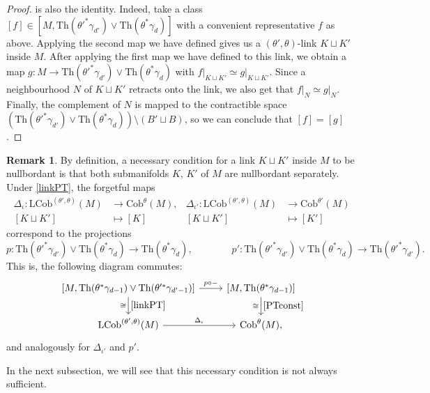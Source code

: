 \documentclass[a4paper, 11pt,reqno]{amsart}
\theoremstyle{plain}
\theoremstyle{definition}
\newtheorem{remark}[theorem]{Remark}
\newcommand{\Th}{\mathrm{Th}}
\begin{document}
\begin{proof}
is also the identity. Indeed, take a class $[f]\in\left[M, \Th(\theta'^\ast\gamma_{d'})\vee\Th(\theta^\ast\gamma_{d})\right]$ with a convenient representative $f$ as above. Applying the second map we have defined gives us a $(\theta',\theta)$-link $K\sqcup K'$ inside $M$. After applying the first map we have defined to this link, we obtain a map $g\colon M\to \Th(\theta'^\ast\gamma_{d'})\vee\Th(\theta^\ast\gamma_{d})$ with $f\big|_{K\sqcup K'}\simeq g\big|_{K\sqcup K'}$. Since a neighbourhood $N$ of $K\sqcup K'$ retracts onto the link, we also get that $f\big|_N\simeq g\big|_N$. Finally, the complement of $N$ is mapped to the contractible space $\left(\Th(\theta'^\ast\gamma_{d'})\vee\Th(\theta^\ast\gamma_{d})\right)\setminus(B'\sqcup B)$, so we can conclude that $[f]=[g]$.\end{proof}
\begin{remark}
By definition, a necessary condition for a link $K\sqcup K'$ inside $M$ to be nullbordant is that both submanifolds $K$, $K'$ of $M$ are nullbordant separately. Under \cref{linkPT}, the forgetful maps 
\begin{align*}
    \Delta_\iota\colon\mathrm{LCob}^{(\theta',\theta)}(M)&\to\mathrm{Cob}^{\theta}(M),& \Delta_{\iota'}\colon\mathrm{LCob}^{(\theta',\theta)}(M)&\to\mathrm{Cob}^{\theta'}(M)\\
    [K\sqcup K']&\mapsto[K]& [K\sqcup K']&\mapsto[K']
\end{align*}
correspond to the projections 
\[p\colon \Th(\theta'^\ast\gamma_{d'})\vee\Th(\theta^\ast\gamma_{d})\to\Th(\theta^\ast\gamma_{d}),\hspace{4em} p'\colon\Th(\theta'^\ast\gamma_{d'})\vee\Th(\theta^\ast\gamma_{d})\to \Th(\theta'^\ast\gamma_{d'}).\]
This is, the following diagram commutes:
\begin{equation}\label{square}
    \begin{tikzcd}        \left[M,\Th(\theta^\ast\gamma_{d-1})\vee\Th(\theta'^\ast\gamma_{d'-1})\right] \arrow{r}{p\circ -} \arrow{d}{\ref{linkPT}}[swap]{\cong} &  \left[M,\Th(\theta^\ast\gamma_{d-1})\right] \arrow{d}{\ref{PTconst}}[swap]{\cong} \\  \mathrm{LCob}^{(\theta',\theta)}(M)  \arrow{r}{\Delta_{\iota}}  &  \mathrm{Cob}^{\theta}(M),
    \end{tikzcd}
\end{equation}
and analogously for $\Delta_{\iota'}$ and $p'$.\par
In the next subsection, we will see that this necessary condition is not always sufficient.\end{remark}
\end{document}
